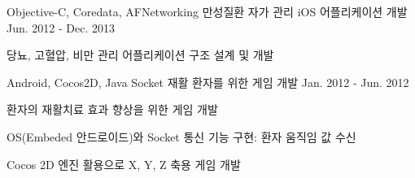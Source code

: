 \begin{cvexpentries}
  \cvexpentry
    {Objective-C, Coredata, AFNetworking}
    {만성질환 자가 관리 iOS 어플리케이션 개발}
    {Jun. 2012 - Dec. 2013}
    {}
    {
        \begin{cvitems}
            \item {당뇨, 고혈압, 비만 관리 어플리케이션 구조 설계 및 개발}
        \end{cvitems}
    }
\end{cvexpentries}

\begin{cvexpentries}
  \cvexpentry
    {Android, Cocos2D, Java Socket}
    {재활 환자를 위한 게임 개발}
    {Jan. 2012 - Jun. 2012}
    {}
    {
        \begin{cvitems}
            \item {환자의 재활치료 효과 향상을 위한 게임 개발}
            \item {OS(Embeded 안드로이드)와 Socket 통신 기능 구현: 환자 움직임 값 수신}
            \item {Cocos 2D 엔진 활용으로 X, Y, Z 축용 게임 개발}
        \end{cvitems}
    }
\end{cvexpentries}

